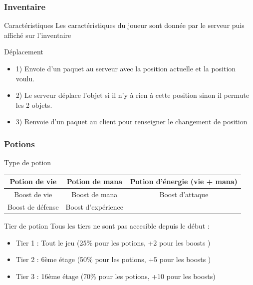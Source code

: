 \documentclass[french]{beamer}
\begin{document}
\begin{frame}
\frametitle{Inventaire}

\begin{block}{Caractéristiques}
Les caractéristiques du joueur sont donnée par le serveur puis affiché sur l'inventaire     
\end{block}

\begin{block}{Déplacement}
\begin{itemize}
    \item 1) Envoie d'un paquet au serveur avec la position actuelle et la position voulu. 
    \item 2) Le serveur déplace l'objet si il n'y à rien à cette position sinon il permute les 2 objets.
    \item 3) Renvoie d'un paquet au client pour renseigner le changement de position
\end{itemize}
\end{block}
\end{frame}

\begin{frame}
\frametitle{Potions}

\begin{block}{Type de potion} 
\begin{tabular}{  | c | c | c |}
    \hline
    Potion de vie & Potion de mana & Potion d'énergie (vie + mana)\\
    \hline
    Boost de vie & Boost de mana & Boost d'attaque\\
    \hline
    Boost de défense & Boost d'expérience &\\
    \hline
\end{tabular}
\end{block}
\begin{block}{Tier de potion} 
Tous les tiers ne sont pas accesible depuis le début : 
\begin{itemize}
     \item Tier 1 : Tout le jeu (25\% pour les potions, +2 pour les boosts )
     \item Tier 2 : 6ème étage (50\% pour les potions, +5 pour les boosts )
     \item Tier 3 : 16ème étage (70\% pour les potions, +10 pour les boosts)
\end{itemize}
\end{block}
\end{frame}
\end{document}
